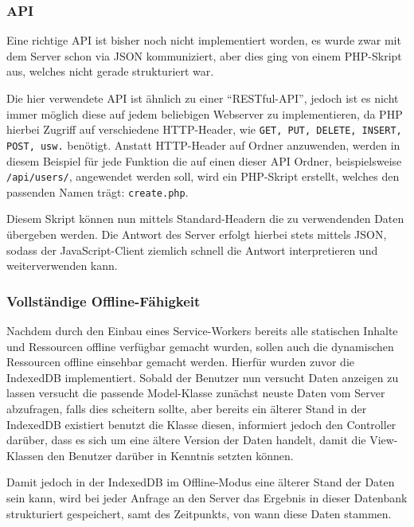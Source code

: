 \documentclass[a4paper,12pt,ngerman,listof=numbered]{scrartcl}      %
\let\oldcite\cite
\renewcommand{\cite}[1]{\textsuperscript{\oldcite{#1}}}
\providecommand{\inlinecode}[1]{\texttt{#1}}
\begin{document}
	\subsubsection{API}
	Eine richtige API ist bisher noch nicht implementiert worden, es wurde zwar mit dem Server schon via JSON kommuniziert, aber dies ging von einem PHP-Skript aus, welches nicht gerade strukturiert war.\par
	Die hier verwendete API ist ähnlich zu einer ``RESTful-API''\cite{wikiRestful}, jedoch ist es nicht immer möglich diese auf jedem beliebigen Webserver zu implementieren, da PHP hierbei Zugriff auf verschiedene HTTP-Header, wie \inlinecode{GET, PUT, DELETE, INSERT, POST, usw.} benötigt. Anstatt HTTP-Header auf Ordner anzuwenden, werden in diesem Beispiel für jede Funktion die auf einen dieser API Ordner, beispielsweise \inlinecode{/api/users/}, angewendet werden soll, wird ein PHP-Skript erstellt, welches den passenden Namen trägt: \inlinecode{create.php}.\par Diesem Skript können nun mittels Standard-Headern die zu verwendenden Daten übergeben werden. Die Antwort des Server erfolgt hierbei stets mittels JSON, sodass der JavaScript-Client ziemlich schnell die Antwort interpretieren und weiterverwenden kann.\par
	
	\subsubsection{Vollständige Offline-Fähigkeit}
	Nachdem durch den Einbau eines Service-Workers bereits alle statischen Inhalte und Ressourcen offline verfügbar gemacht wurden, sollen auch die dynamischen Ressourcen offline einsehbar gemacht werden. Hierfür wurden zuvor die IndexedDB implementiert. Sobald der Benutzer nun versucht Daten anzeigen zu lassen versucht die passende Model-Klasse zunächst neuste Daten vom Server abzufragen, falls dies scheitern sollte, aber bereits ein älterer Stand in der IndexedDB existiert benutzt die Klasse diesen, informiert jedoch den Controller darüber, dass es sich um eine ältere Version der Daten handelt, damit die View-Klassen den Benutzer darüber in Kenntnis setzten können.\par
	Damit jedoch in der IndexedDB im Offline-Modus eine älterer Stand der Daten sein kann, wird bei jeder Anfrage an den Server das Ergebnis in dieser Datenbank strukturiert gespeichert, samt des Zeitpunkts, von wann diese Daten stammen.
	
\end{document}
